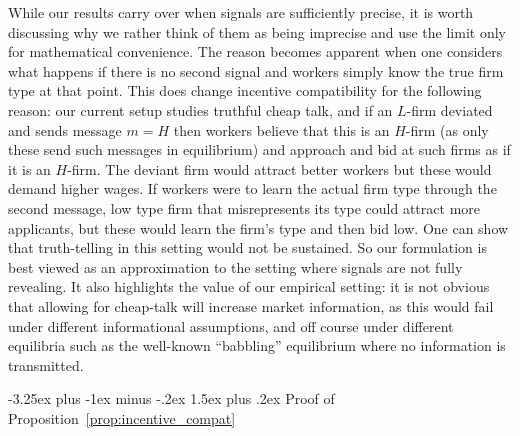 \documentclass[12pt]{article}
\makeatletter
\renewcommand{\subsection}{%
  \@startsection{subsection}{2}{\z@}%
  {-3.25ex plus -1ex minus -.2ex}%
  {1.5ex plus .2ex}%
  {\normalfont\large\bfseries}%
}
\makeatother
\begin{document}
While our results carry over when signals are sufficiently precise, it is worth discussing why we rather think of them as being imprecise and use the limit only for mathematical convenience. The reason becomes apparent when one considers what happens if there is no second signal and workers simply know the true firm type at that point. This does change incentive compatibility for the following reason: our current setup studies truthful cheap talk, and if an $L$-firm deviated and sends message $m=H$ then workers believe that this is an $H$-firm (as only these send such messages in equilibrium) and approach and bid at such firms as if it is an $H$-firm. The deviant firm would attract better workers but these would demand higher wages. If workers were to learn the actual firm type through the second message, low type firm that
misrepresents its type could attract more applicants, but these would
learn the firm's type and then bid low. One can show that truth-telling in this
setting would not be sustained. So our formulation is best viewed as an
approximation to the setting where signals are not fully revealing. It also
highlights the value of our empirical setting: it is not obvious that
allowing for cheap-talk will increase market information, as this would fail
under different informational assumptions, and off course under different
equilibria such as the well-known ``babbling'' equilibrium where no
information is transmitted.



\subsection{Proof of Proposition~\ref{prop:incentive_compat}}
\label{online_app:ic_proof}
\end{document}
